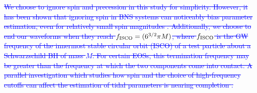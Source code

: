 \documentclass[twocolumn,prd,amssymb,aps,nofootinbib,showpacs,epsf]{revtex4}
\newcommand{\red}{\textcolor{red}}
\newcommand\les[2]{\textcolor{blue}{{#1}\sout{#2}}}
\begin{document}
\les{}{We choose to ignore spin and precession in this study for simplicity.  However, it has been shown that ignoring spin in BNS systems can noticeably bias parameter estimation, even for relatively small spin magnitudes \cite{Favata2014}.  Additionally, we choose to end our waveforms when they reach $f_{\rm ISCO}=(6^{3/2}\pi M)$, where $f_{\rm ISCO}$ is the GW frequency of the innermost stable circular orbit (ISCO) of a test particle about a Schwarzschild BH of mass $M$.  For certain EOSs, this termination frequency may be greater than the frequency at which the two components come into contact.  A parallel investigation which studies how spin and the choice of high-frequency cutoffs can affect the estimation of tidal parameters is nearing completion \cite{Nikhef_paper_2}.}


\end{document}
